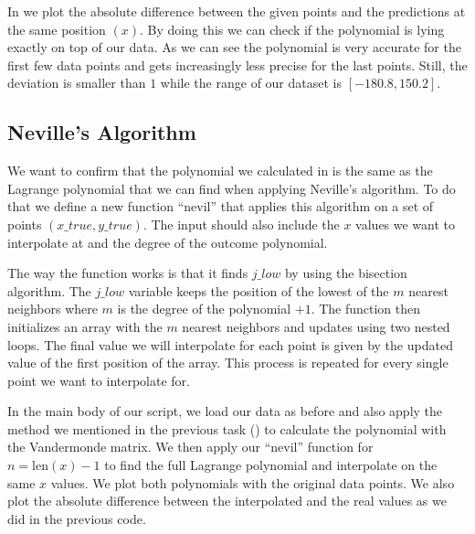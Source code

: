 \documentclass[a4paper,10pt]{article}
\begin{document}
In  we plot the absolute difference between the given points and the predictions at the same position $(x)$. By doing this we can check if the polynomial is lying exactly on top of our data. As we can see the polynomial is very accurate for the first few data points and gets increasingly less precise for the last points. Still, the deviation is smaller than $1$ while the range of our dataset is $[-180.8,150.2]$.  

\subsection{Neville’s Algorithm}
\label{chap:nev}



We want to confirm that the polynomial we calculated in  is the same as the Lagrange polynomial that we can find when applying Neville's algorithm. To do that we define a new function ``nevil'' that applies this algorithm on a set of points $(x\_true,y\_true)$. The input should also include the $x$ values we want to interpolate at and the degree of the outcome polynomial. 

The way the function works is that it finds $j\_low$ by using the bisection algorithm. The $j\_low$ variable keeps the position of the lowest of the $m$ nearest neighbors where $m$ is the degree of the polynomial $+1$. The function then initializes an array with the $m$ nearest neighbors and updates using two nested loops. The final value we will interpolate for each point is given by the updated value of the first position of the array. This process is repeated for every single point we want to interpolate for. 

In the main body of our script, we load our data as before and also apply the method we mentioned in the previous task () to calculate the polynomial with the Vandermonde matrix. We then apply our ``nevil'' function for $n=\mathrm{len}(x)-1$ to find the full Lagrange polynomial and interpolate on the same $x$ values. We plot both polynomials with the original data points. We also plot the absolute difference between the interpolated and the real values as we did in the previous code. 
\end{document}
